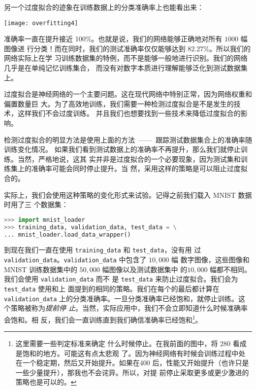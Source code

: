 另一个过度拟合的迹象在训练数据上的分类准确率上也能看出来：
\begin{center}
  \texttt{[image: overfitting4]}
\end{center}

准确率一直在提升接近 100\%。也就是说，我们的网络能够正确地对所有 $1000$ 幅图像进
行分类！而在同时，我们的测试准确率仅仅能够达到 82.27\%。所以我们的网络实际上在学
习训练数据集的特例，而不是能够一般地进行识别。我们的网络几乎是在单纯记忆训练集合，
而没有对数字本质进行理解能够泛化到测试数据集上。

过度拟合是神经网络的一个主要问题。这在现代网络中特别正常，因为网络权重和偏置数量巨
大。为了高效地训练，我们需要一种检测过度拟合是不是发生的技术，这样我们不会过度训练。
并且我们也想要找到一些技术来降低过度拟合的影响。

检测过度拟合的明显方法是使用上面的方法~——~跟踪测试数据集合上的准确率随训练变化情况。
如果我们看到测试数据上的准确率不再提升，那么我们就停止训练。当然，严格地说，这其
实并非是过度拟合的一个必要现象，因为测试集和训练集上的准确率可能会同时停止提升。当
然，采用这样的策略是可以阻止过度拟合的。

实际上，我们会使用这种策略的变化形式来试验。记得之前我们载入 MNIST 数据时用了三
个数据集：

\begin{lstlisting}[language=Python]
>>> import mnist_loader
>>> training_data, validation_data, test_data = \
... mnist_loader.load_data_wrapper()
\end{lstlisting}

到现在我们一直在使用 \lstinline!training_data! 和 \lstinline!test_data!，没有用
过 \lstinline!validation_data!。\lstinline!validation_data! 中包含了 $10,000$ 幅
数字图像，这些图像和 MNIST 训练数据集中的 $50,000$ 幅图像以及测试数据集中
的$10,000$ 幅都不相同。我们会使用 \lstinline!validation_data! 而不
是 \lstinline!test_data! 来防止过度拟合。我们会为 \lstinline!test_data! 使用和上
面提到的相同的策略。我们在每个\epoch{}的最后都计算在 \lstinline!validation_data!
上的分类准确率。一旦分类准确率已经饱和，就停止训练。这个策略被称为\emph{提前停
  止}。当然，实际应用中，我们不会立即知道什么时候准确率会饱和。相
反，我们会一直训练直到我们确信准确率已经饱和\footnote{这里需要一些判定标准来确定
  什么时候停止。在我前面的图中，将 280 \epoch{}看成是饱和的地方。可能这有点太悲观
  了。因为神经网络有时候会训练过程中处在一个稳定期，然后又开始提升。如果在400
  \epoch{}后，性能又开始提升（也许只是一些少量提升），那我也不会诧异。所以，对提
  前停止采取更多或更少激进的策略也是可以的。}。

